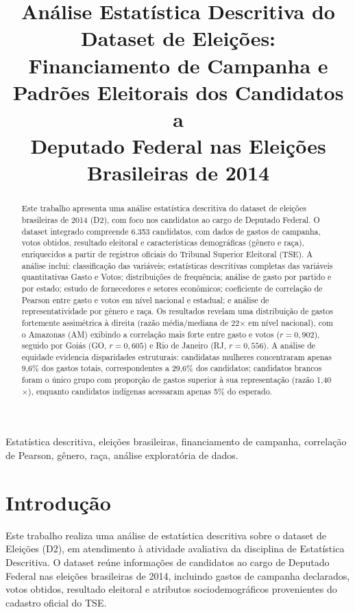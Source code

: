 \documentclass[conference]{IEEEtran}
\title{Análise Estatística Descritiva do Dataset de Eleições:\\
Financiamento de Campanha e Padrões Eleitorais dos Candidatos a\\
Deputado Federal nas Eleições Brasileiras de 2014}
\author{
  \IEEEauthorblockN{Heitor Teixeira - 2651254}
  \IEEEauthorblockA{
    \textit{MBA: Ciência de dados}\\
    UNIFOR\\
    Fortaleza, Brasil\\
    heitor.mba.unifor@gmail.com
  }
}
\begin{document}
\maketitle

\begin{abstract}
Este trabalho apresenta uma análise estatística descritiva do dataset de
eleições brasileiras de 2014 (D2), com foco nos candidatos ao cargo de
Deputado Federal. O dataset integrado compreende 6.353 candidatos, com
dados de gastos de campanha, votos obtidos, resultado eleitoral e
características demográficas (gênero e raça), enriquecidos a partir de
registros oficiais do Tribunal Superior Eleitoral (TSE). A análise
inclui: classificação das variáveis; estatísticas descritivas completas
das variáveis quantitativas Gasto e Votos; distribuições de frequência;
análise de gasto por partido e por estado; estudo de fornecedores e setores
econômicos; coeficiente de correlação de Pearson entre gasto e votos em nível
nacional e estadual; e análise de representatividade por gênero e raça.
Os resultados revelam uma distribuição de gastos fortemente assimétrica à
direita (razão média/mediana de 22$\times$ em nível nacional), com o Amazonas
(AM) exibindo a correlação mais forte entre gasto e votos ($r = 0{,}902$),
seguido por Goiás (GO, $r = 0{,}605$) e Rio de Janeiro (RJ, $r = 0{,}556$).
A análise de equidade evidencia disparidades estruturais: candidatas mulheres
concentraram apenas 9{,}6\% dos gastos totais, correspondentes a 29{,}6\% dos
candidatos; candidatos brancos foram o único grupo com proporção de gastos
superior à sua representação (razão 1{,}40$\times$), enquanto candidatos
indígenas acessaram apenas 5\% do esperado.
\end{abstract}

\begin{IEEEkeywords}
Estatística descritiva, eleições brasileiras, financiamento de campanha,
correlação de Pearson, gênero, raça, análise exploratória de dados.
\end{IEEEkeywords}

\section{Introdução}

Este trabalho realiza uma análise de estatística descritiva sobre o dataset
de Eleições (D2), em atendimento à atividade avaliativa da disciplina de
Estatística Descritiva. O dataset reúne informações de candidatos ao cargo
de Deputado Federal nas eleições brasileiras de 2014, incluindo gastos de
campanha declarados, votos obtidos, resultado eleitoral e atributos
sociodemográficos provenientes do cadastro oficial do TSE.
\end{document}
